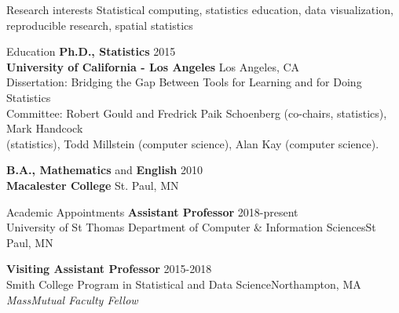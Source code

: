 \documentclass{resume} %
\begin{document}
\begin{rSection}{Research interests}
Statistical computing, statistics education, data visualization, reproducible research, spatial statistics
\end{rSection}


\begin{rSection}{Education}
{\bf Ph.D., Statistics} \hfill 2015\\ 
{\bf University of California - Los Angeles} \hfill Los Angeles, CA \\
{Dissertation: Bridging the Gap Between Tools for Learning and for Doing Statistics} \\
{Committee: Robert Gould and Fredrick Paik Schoenberg (co-chairs, statistics), Mark Handcock \\(statistics), Todd Millstein (computer science), Alan Kay (computer science).} \smallskip 

{\bf B.A., Mathematics} and {\bf English}  \hfill  2010 \\
{\bf Macalester College} \hfill St. Paul, MN\smallskip 
\end{rSection}



\begin{rSection}{Academic Appointments}
{\bf Assistant Professor} \hfill {2018-present} \\
{University of St Thomas Department of Computer \& Information Sciences}\hfill {St Paul, MN} 

{\bf Visiting Assistant Professor} \hfill {2015-2018} \\
{Smith College Program in Statistical and Data Science}\hfill {Northampton, MA} \\
\emph{MassMutual Faculty Fellow} 
\end{rSection}



\end{document}
